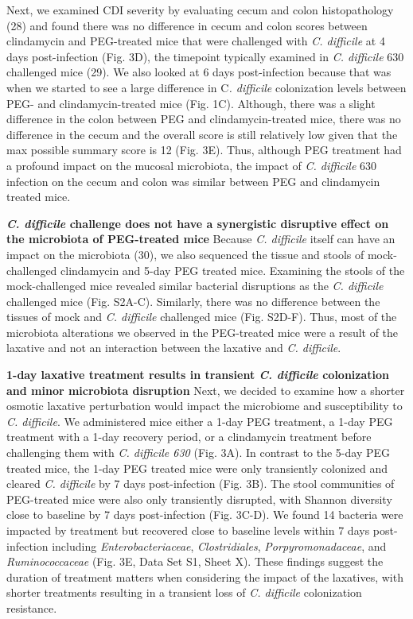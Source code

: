 \documentclass[
  11pt,
]{article}
\begin{document}
Next, we examined CDI severity by evaluating cecum and colon
histopathology (28) and found there was no difference in cecum and colon
scores between clindamycin and PEG-treated mice that were challenged
with \emph{C. difficile} at 4 days post-infection (Fig. 3D), the
timepoint typically examined in \emph{C. difficile} 630 challenged mice
(29). We also looked at 6 days post-infection because that was when we
started to see a large difference in C\emph{. difficile} colonization
levels between PEG- and clindamycin-treated mice (Fig. 1C). Although,
there was a slight difference in the colon between PEG and
clindamycin-treated mice, there was no difference in the cecum and the
overall score is still relatively low given that the max possible
summary score is 12 (Fig. 3E). Thus, although PEG treatment had a
profound impact on the mucosal microbiota, the impact of \emph{C.
difficile} 630 infection on the cecum and colon was similar between PEG
and clindamycin treated mice.

\textbf{\emph{C. difficile} challenge does not have a synergistic
disruptive effect on the microbiota of PEG-treated mice} Because
\emph{C. difficile} itself can have an impact on the microbiota (30), we
also sequenced the tissue and stools of mock-challenged clindamycin and
5-day PEG treated mice. Examining the stools of the mock-challenged mice
revealed similar bacterial disruptions as the \emph{C. difficile}
challenged mice (Fig. S2A-C). Similarly, there was no difference between
the tissues of mock and \emph{C. difficile} challenged mice (Fig.
S2D-F). Thus, most of the microbiota alterations we observed in the
PEG-treated mice were a result of the laxative and not an interaction
between the laxative and \emph{C. difficile}.

\textbf{1-day laxative treatment results in transient \emph{C.
difficile} colonization and minor microbiota disruption} Next, we
decided to examine how a shorter osmotic laxative perturbation would
impact the microbiome and susceptibility to \emph{C. difficile}. We
administered mice either a 1-day PEG treatment, a 1-day PEG treatment
with a 1-day recovery period, or a clindamycin treatment before
challenging them with \emph{C. difficile 630} (Fig. 3A). In contrast to
the 5-day PEG treated mice, the 1-day PEG treated mice were only
transiently colonized and cleared \emph{C. difficile} by 7 days
post-infection (Fig. 3B). The stool communities of PEG-treated mice were
also only transiently disrupted, with Shannon diversity close to
baseline by 7 days post-infection (Fig. 3C-D). We found 14 bacteria were
impacted by treatment but recovered close to baseline levels within 7
days post-infection including \emph{Enterobacteriaceae},
\emph{Clostridiales}, \emph{Porpyromonadaceae}, and
\emph{Ruminococcaceae} (Fig. 3E, Data Set S1, Sheet X). These findings
suggest the duration of treatment matters when considering the impact of
the laxatives, with shorter treatments resulting in a transient loss of
\emph{C. difficile} colonization resistance.
\end{document}
